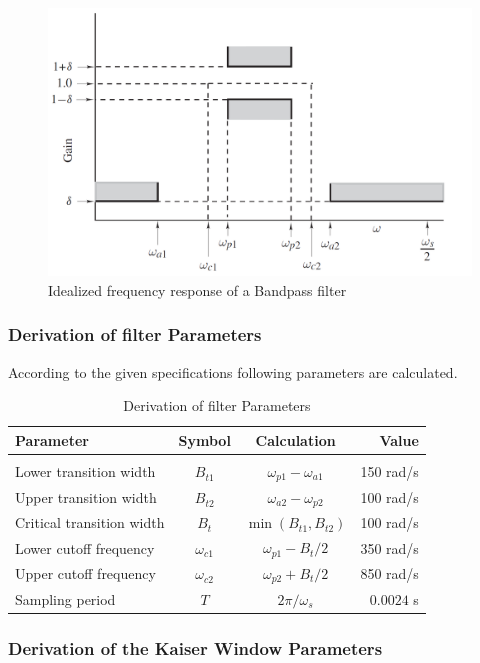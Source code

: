 \documentclass[a4paper,11pt]{article}%
\begin{document}
\begin{figure}[!h]
	\centering
	\includegraphics[scale=0.4]{figures/filtersepecs}
	\caption{Idealized frequency response of a Bandpass filter\cite{antonio}}
\end{figure}
\pagebreak
\subsubsection{Derivation of filter Parameters}

According to the given specifications following parameters are calculated.

\begin{table}[!h]
	\centering
\begin{tabular}{l c c r}
\textbf{Parameter}& \textbf{Symbol}& \textbf{Calculation}&\textbf{Value}\\\hline
&&&\\
Lower transition width& $B_{t1}$& $\omega_{p1} - \omega_{a1}$&150 rad/s\\
Upper transition width& $B_{t2}$&$\omega_{a2}-\omega_{p2}$&100 rad/s\\
Critical transition width& $B_t$&$\min(B_{t1},B_{t2})$&100 rad/s\\
Lower cutoff frequency& $\omega_{c1}$&$\omega_{p1}-B_t/2$&350 rad/s\\
Upper cutoff frequency& $\omega_{c2}$&$\omega_{p2}+B_t/2 $&850 rad/s \\
Sampling period& $T$& $2\pi / \omega_s$&$0.0024$ s\\
\hline\hline
\end{tabular}
\caption{Derivation of filter Parameters}
\end{table}

\subsubsection{Derivation of the Kaiser Window Parameters}
\end{document}
